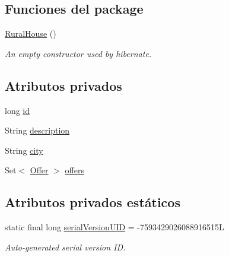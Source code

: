 \subsection*{Funciones del \textquotesingle{}package\textquotesingle{}}
\begin{DoxyCompactItemize}
\item 
\mbox{\hyperlink{classcom_1_1ruralhousejsf_1_1domain_1_1_rural_house_a6312a6b35355d7883853544db74662f8}{Rural\+House}} ()
\begin{DoxyCompactList}\small\item\em An empty constructor used by hibernate. \end{DoxyCompactList}\end{DoxyCompactItemize}
\subsection*{Atributos privados}
\begin{DoxyCompactItemize}
\item 
long \mbox{\hyperlink{classcom_1_1ruralhousejsf_1_1domain_1_1_rural_house_ad9352e84ead5c4feb7eadee60570d9de}{id}}
\item 
String \mbox{\hyperlink{classcom_1_1ruralhousejsf_1_1domain_1_1_rural_house_a3cd460d3df936008a7c7580e87680fd4}{description}}
\item 
String \mbox{\hyperlink{classcom_1_1ruralhousejsf_1_1domain_1_1_rural_house_a495797ff9bd294c83563790e36ec2245}{city}}
\item 
Set$<$ \mbox{\hyperlink{classcom_1_1ruralhousejsf_1_1domain_1_1_offer}{Offer}} $>$ \mbox{\hyperlink{classcom_1_1ruralhousejsf_1_1domain_1_1_rural_house_a8e07bbd638166d5d9356828a4ce09488}{offers}}
\end{DoxyCompactItemize}
\subsection*{Atributos privados estáticos}
\begin{DoxyCompactItemize}
\item 
static final long \mbox{\hyperlink{classcom_1_1ruralhousejsf_1_1domain_1_1_rural_house_a2ef1095a366b8e08e491c70cd421b907}{serial\+Version\+U\+ID}} = -\/7593429026088916515L
\begin{DoxyCompactList}\small\item\em Auto-\/generated serial version ID. \end{DoxyCompactList}\end{DoxyCompactItemize}


